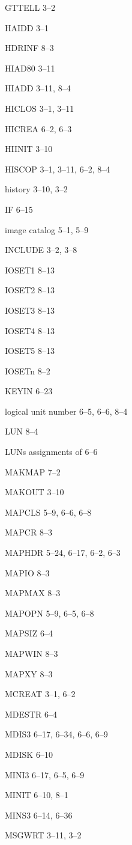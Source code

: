 \item GTTELL 3--2
\item HAIDD 3--1
\item HDRINF 8--3
\item HIAD80 3--11
\item HIADD 3--11, 8--4
\item HICLOS 3--1, 3--11
\item HICREA 6--2, 6--3
\item HIINIT 3--10
\item HISCOP 3--1, 3--11, 6--2, 8--4
\item history 3--10, 3--2
\item IF 6--15
\item image catalog 5--1, 5--9
\item INCLUDE 3--2, 3--8
\item IOSET1 8--13
\item IOSET2 8--13
\item IOSET3 8--13
\item IOSET4 8--13
\item IOSET5 8--13
\item IOSETn 8--2
\item KEYIN 6--23
\item logical unit number 6--5, 6--6, 8--4
\item LUN 8--4
\item LUNs assignments of 6--6
\item MAKMAP 7--2
\item MAKOUT 3--10
\item MAPCLS 5--9, 6--6, 6--8
\item MAPCR 8--3
\item MAPHDR 5--24, 6--17, 6--2, 6--3
\item MAPIO 8--3
\item MAPMAX 8--3
\item MAPOPN 5--9, 6--5, 6--8
\item MAPSIZ 6--4
\item MAPWIN 8--3
\item MAPXY 8--3
\item MCREAT 3--1, 6--2
\item MDESTR 6--4
\item MDIS3 6--17, 6--34, 6--6, 6--9
\item MDISK 6--10
\item MINI3 6--17, 6--5, 6--9
\item MINIT 6--10, 8--1
\item MINS3 6--14, 6--36
\item MSGWRT 3--11, 3--2
